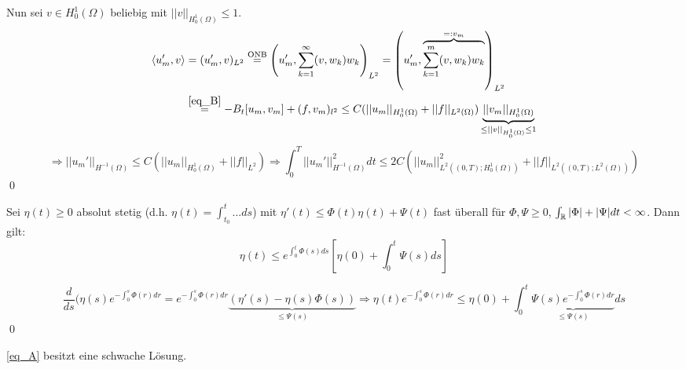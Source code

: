 	Nun sei $v \in H_0^1(\Omega)$ beliebig mit $||v||_{H_0^1(\Omega)} \leq 1$.
	\begin{equation}
	\begin{aligned}
		\langle u_m',v \rangle &= (u_m',v)_{L^2} \overset{\text{ONB}}{=} \enbrace*{u_m', \sum\limits_{k=1}^\infty (v,w_k)w_k}_{L^2} = \enbrace*{u_m', \overbrace{\sum\limits_{k=1}^{m} (v,w_k)w_k}^{=: v_m}}_{L^2} \\
		&\overset{\eqref{eq_B}}{=} -B_t [u_m,v_m] + (f,v_m)_{l^2} \leq C (||u_m||_{H_0^1(\Omega)} + ||f||_{L^2(\Omega)}) \underbrace{||v_m||_{H_0^1(\Omega)}}_{\leq ||v||_{H_0^1(\Omega)} \leq 1} \notag
	\end{aligned}
	\end{equation}
	\[ \Rightarrow ||u_m'||_{H^{-1}(\Omega)} \leq C( ||u_m||_{H_0^1(\Omega)} + ||f||_{L^2}) \Rightarrow \int_{0}^{T} ||u_m'||_{H^{-1}(\Omega)}^2 dt \leq 2C (||u_m||_{L^2((0,T);H_0^1(\Omega))}^2 + ||f||_{L^2((0,T);L^2(\Omega))}) \]
	\qed
	
\begin{lemma} \label{gronwall}
	Sei $\eta(t) \geq 0$ absolut stetig  (d.h. $\eta(t) = \int_{t_0}^{t} \dots ds$) mit $\eta'(t) \leq \Phi(t) \eta(t) + \Psi(t)$ fast überall für $\Phi,\Psi \geq 0$, $\int_{\RR} |\Phi|+|\Psi| dt < \infty$. Dann gilt:
	\[ \eta(t) \leq e^{\int_0^t \Phi(s) ds} \left\lbrack \eta(0) + \int_{0}^{t} \Psi(s) ds\right\rbrack \]
\end{lemma}

	\[ \frac{d}{ds} (\eta(s) e^{-\int_{0}^{s} \Phi(r) dr} = e^{-\int_{0}^{s} \Phi(r) dr} \underbrace{(\eta'(s) - \eta(s) \Phi(s))}_{\leq \Psi(s)} \Rightarrow \eta(t) e^{-\int_{0}^{s} \Phi(r) dr} \leq \eta(0) + \int_{0}^{t} \underbrace{\Psi(s) e^{-\int_{0}^{s} \Phi(r)dr}}_{\leq \Psi(s)} ds \] \qed
	
\begin{thm}
	\eqref{eq_A} besitzt eine schwache Lösung.
\end{thm}
	
